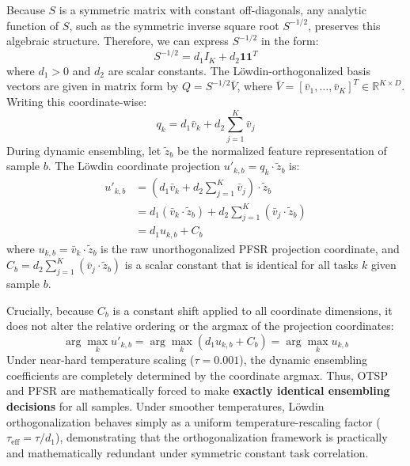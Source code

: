 \documentclass{article}
\theoremstyle{plain}
\theoremstyle{definition}
\theoremstyle{remark}
\begin{document}
Because $S$ is a symmetric matrix with constant off-diagonals, any analytic function of $S$, such as the symmetric inverse square root $S^{-1/2}$, preserves this algebraic structure. Therefore, we can express $S^{-1/2}$ in the form:
\begin{equation}
S^{-1/2} = d_1 I_K + d_2 \mathbf{1}\mathbf{1}^T
\end{equation}
where $d_1 > 0$ and $d_2$ are scalar constants. The L{\"o}wdin-orthogonalized basis vectors are given in matrix form by $Q = S^{-1/2} \bar{V}$, where $\bar{V} = [\bar{v}_1, \dots, \bar{v}_K]^T \in \mathbb{R}^{K \times D}$. Writing this coordinate-wise:
\begin{equation}
q_k = d_1 \bar{v}_k + d_2 \sum_{j=1}^K \bar{v}_j
\end{equation}
During dynamic ensembling, let $\tilde{z}_b$ be the normalized feature representation of sample $b$. The L{\"o}wdin coordinate projection $u'_{k,b} = q_k \cdot \tilde{z}_b$ is:
\begin{align}
u'_{k,b} &= \left( d_1 \bar{v}_k + d_2 \sum_{j=1}^K \bar{v}_j \right) \cdot \tilde{z}_b \\
&= d_1 (\bar{v}_k \cdot \tilde{z}_b) + d_2 \sum_{j=1}^K (\bar{v}_j \cdot \tilde{z}_b) \\
&= d_1 u_{k,b} + C_b
\end{align}
where $u_{k,b} = \bar{v}_k \cdot \tilde{z}_b$ is the raw unorthogonalized PFSR projection coordinate, and $C_b = d_2 \sum_{j=1}^K (\bar{v}_j \cdot \tilde{z}_b)$ is a scalar constant that is identical for all tasks $k$ given sample $b$.

Crucially, because $C_b$ is a constant shift applied to all coordinate dimensions, it does not alter the relative ordering or the argmax of the projection coordinates:
\begin{equation}
\arg\max_k u'_{k,b} = \arg\max_k (d_1 u_{k,b} + C_b) = \arg\max_k u_{k,b}
\end{equation}
Under near-hard temperature scaling ($\tau = 0.001$), the dynamic ensembling coefficients are completely determined by the coordinate argmax. Thus, OTSP and PFSR are mathematically forced to make \textbf{exactly identical ensembling decisions} for all samples. Under smoother temperatures, L{\"o}wdin orthogonalization behaves simply as a uniform temperature-rescaling factor ($\tau_{\text{eff}} = \tau / d_1$), demonstrating that the orthogonalization framework is practically and mathematically redundant under symmetric constant task correlation.
\end{document}
